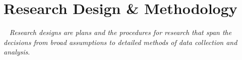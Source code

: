 \section{Research Design \& Methodology}~\label{sec:design}
\textit{Research designs are plans and the procedures for research that span the decisions from broad assumptions to detailed methods of data collection and analysis}.
